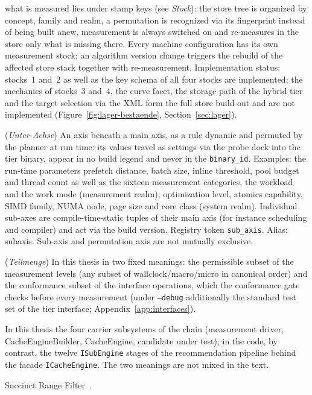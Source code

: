 \begin{description}
  what is measured lies under stamp keys (see \emph{Stock}): the store tree is organized by
  concept, family and realm, a permutation is recognized via its fingerprint instead of being built
  anew, measurement is always switched on and re-measures in the store only what is missing there.
  Every machine configuration has its own measurement stock; an algorithm version change triggers
  the rebuild of the affected store stack together with re-measurement. Implementation status:
  stocks~1 and~2 as well as the key schema of all four stocks are implemented; the mechanics of
  stocks~3 and~4, the curve facet, the storage path of the hybrid tier and the target selection
  via the XML form the full store build-out and are not implemented
  (Figure~\ref{fig:lager-bestaende}, Section~\ref{sec:lager}).
  \item[Sub-axis] (\emph{Unter-Achse}) An axis beneath a main axis, as a rule dynamic and permuted
  by the planner at run time: its values travel as settings via the probe dock into the tier
  binary, appear in no build legend and never in the \texttt{binary\_id}. Examples: the run-time
  parameters prefetch distance, batch size, inline threshold, pool budget and thread count as well
  as the sixteen measurement categories, the workload and the work mode (measurement realm);
  optimization level, atomics capability, SIMD family, NUMA node, page size and core class (system
  realm). Individual sub-axes are compile-time-static tuples of their main axis (for instance
  scheduling and compiler) and act via the build version. Registry token \texttt{sub\_axis}.
  Alias: subaxis. Sub-axis and permutation axis are not mutually exclusive.
  \item[Subset] (\emph{Teilmenge}) In this thesis in two fixed meanings: the permissible subset of
  the measurement levels (any subset of wallclock/macro/micro in canonical order) and the
  conformance subset of the interface operations, which the conformance gate checks before every
  measurement (under \texttt{--debug} additionally the standard test set of the tier interface; Appendix~\ref{app:interfaces}).
  \item[Subsystem] In this thesis the four carrier subsystems of the chain (measurement driver,
  CacheEngineBuilder, CacheEngine, candidate under test); in the code, by contrast, the twelve
  \texttt{ISubEngine} stages of the recommendation pipeline behind the facade
  \texttt{ICacheEngine}. The two meanings are not mixed in the text.
  \item[SuRF] Succinct Range Filter~\cite{zhang2018surf}.

\end{description}
